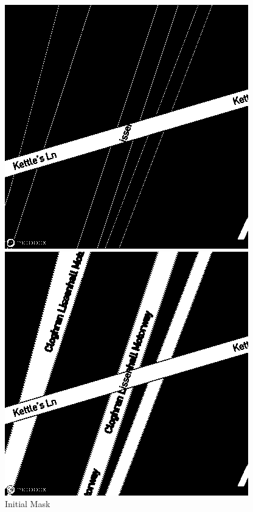 \begin{figure}[htbp]
\begin{minipage}{0.45\textwidth}
        \includegraphics[width=\textwidth]{images/old_mask.png}
        \caption*{Initial Mask}
    \end{minipage}
    \hfill
    \begin{minipage}{0.45\textwidth}
        \centering
        \includegraphics[width=\textwidth]{images/new_mask.png}

\end{minipage}
\end{figure}
